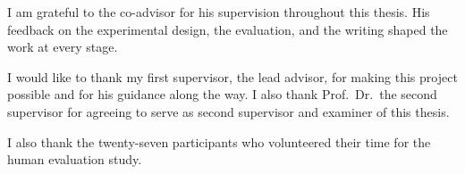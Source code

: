 I am grateful to the co-advisor for his supervision throughout
this thesis. His feedback on the experimental design, the evaluation, and the
writing shaped the work at every stage.

I would like to thank my first supervisor, the lead advisor, for
making this project possible and for his guidance along the way. I also
thank Prof.\ Dr.\ the second supervisor for agreeing to serve as second supervisor
and examiner of this thesis.

I also thank the twenty-seven participants who volunteered their time for
the human evaluation study.
